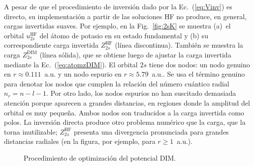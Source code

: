 A pesar de que el procedimiento de inversión dado por la 
Ec.~(\ref{eq:Vinv}) es directo, su implementación a partir de las 
soluciones HF no produce, en general, cargas invertidas suaves. Por 
ejemplo, en la Fig.~\ref{fig:2sK} se muestra (a)~el orbital 
$u_{2s}^{\mathrm{HF}}$ del átomo de potasio en su estado fundamental y 
(b) su correspondiente carga invertida $Z_{2s}^{\mathrm{HF}}$ (línea 
discontinua). También se muestra la carga $Z_{2s}^{\mathrm{DIM}}$ (línea 
sólida), que se obtiene luego de ajustar la carga invertida mediante la 
Ec.~(\ref{eq:atomzDIM}). El orbital $2s$ tiene dos nodos: un nodo 
genuino en $r\approx 0.111$~a.u. y un nodo espurio en 
\mbox{$r\approx 5.79$~a.u.}. Se usa el término genuino para denotar los 
nodos que cumplen la relación del número cuántico radial $n_r=n-l-1$. 
Por otro lado, los nodos espurios no han suscitado demasiada atención 
porque aparecen a grandes distancias, en regiones donde la amplitud del 
orbital es muy pequeña. Ambos nodos son traducidos a la carga invertida 
como polos. La inversión directa produce otro problema numérico que la
carga, que la torna inutilizable; $Z_{2s}^{\mathrm{HF}}$ presenta una 
divergencia pronunciada para grandes distancias radiales (en la figura, 
por ejemplo, para $r\geq 1$~a.u.). 

\begin{figure}[t]
\centering
{}
\caption{Procedimiento de optimización del potencial DIM.}
\label{fig:procDIM}
\end{figure}


